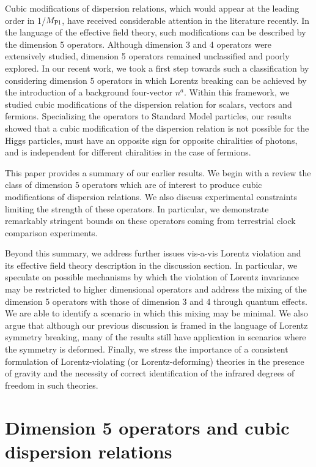 \documentclass[12pt]{article}
\newcommand{\Mpl}{$M_{\rm {\small Pl}}$}
\begin{document}
Cubic modifications of dispersion relations, which would appear at
the leading order in 1/\Mpl, have received considerable attention
in the literature
recently\cite{mass,rot,Jacob,wow,wow2,contrast,dsr}. In the
language of the effective field theory, such modifications can be
described by the dimension 5 operators. Although dimension 3 and 4
operators were extensively studied\cite{Kost}, dimension 5
operators remained unclassified and poorly explored. In our recent
work\cite{prl}, we took a first step towards such a classification
by considering dimension 5 operators in which Lorentz breaking can
be achieved by the introduction of a background four-vector $n^a$.
Within this framework, we studied cubic modifications of the
dispersion relation for scalars, vectors and fermions.
Specializing the operators to Standard Model particles, our
results showed that a cubic modification of the dispersion
relation is not possible for the Higgs particles, must have an
opposite sign for opposite chiralities of photons, and is
independent for different chiralities in the case of fermions.

This paper provides a summary of our earlier results\cite{prl}. We
begin with a review the class of dimension 5 operators which are
of interest to produce cubic modifications of dispersion
relations. We also discuss experimental constraints limiting the
strength of these operators. In particular, we demonstrate
remarkably stringent bounds\cite{prl} on these operators coming
from terrestrial clock comparison experiments.

Beyond this summary, we address further issues vis-a-vis Lorentz
violation and its effective field theory description in the
discussion section. In particular, we speculate on possible
mechanisms by which the violation of Lorentz invariance may be
restricted to higher dimensional operators and address the mixing
of the dimension 5 operators with those of dimension 3 and 4
through quantum effects. We are able to identify a scenario in
which this mixing may be minimal. We also argue that although our
previous discussion is framed in the language of Lorentz symmetry
breaking, many of the results still have application in scenarios
where the symmetry is deformed\cite{dsr}. Finally, we stress the
importance of a consistent formulation of Lorentz-violating (or
Lorentz-deforming) theories in the presence of
gravity\cite{gravity} and the necessity of correct identification
of the infrared degrees of freedom in such theories.


\section{Dimension 5 operators and cubic dispersion relations}
\end{document}
